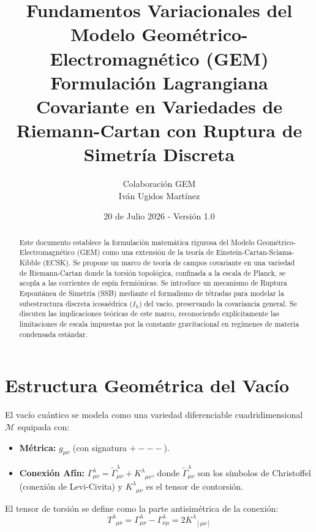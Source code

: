 \documentclass[12pt, a4paper]{article}
\title{\textbf{Fundamentos Variacionales del Modelo Geométrico-Electromagnético (GEM)} \\[0.3cm]
\large Formulación Lagrangiana Covariante en Variedades de Riemann-Cartan con Ruptura de Simetría Discreta}
\author{Colaboración GEM \\ Iván Ugidos Martínez}
\date{20 de Julio 2026 - Versión 1.0}
\begin{document}
\maketitle

\begin{abstract}
\noindent Este documento establece la formulación matemática rigurosa del Modelo Geométrico-Electromagnético (GEM) como una extensión de la teoría de Einstein-Cartan-Sciama-Kibble (ECSK). Se propone un marco de teoría de campos covariante en una variedad de Riemann-Cartan donde la torsión topológica, confinada a la escala de Planck, se acopla a las corrientes de espín fermiónicas. Se introduce un mecanismo de Ruptura Espontánea de Simetría (SSB) mediante el formalismo de tétradas para modelar la subestructura discreta icosaédrica ($I_h$) del vacío, preservando la covariancia general. Se discuten las implicaciones teóricas de este marco, reconociendo explícitamente las limitaciones de escala impuestas por la constante gravitacional en regímenes de materia condensada estándar.
\end{abstract}

\tableofcontents
\newpage

\section{Estructura Geométrica del Vacío}

El vacío cuántico se modela como una variedad diferenciable cuadridimensional $\mathcal{M}$ equipada con:
\begin{itemize}
    \item \textbf{Métrica:} $g_{\mu\nu}$ (con signatura $+---$).
    \item \textbf{Conexión Afín:} $\Gamma^\lambda_{\mu\nu} = \tilde{\Gamma}^\lambda_{\mu\nu} + K^\lambda_{\phantom{\lambda}\mu\nu}$, donde $\tilde{\Gamma}^\lambda_{\mu\nu}$ son los símbolos de Christoffel (conexión de Levi-Civita) y $K^\lambda_{\phantom{\lambda}\mu\nu}$ es el tensor de contorsión.
\end{itemize}

El tensor de torsión se define como la parte antisimétrica de la conexión:
\begin{equation}
    T^\lambda_{\phantom{\lambda}\mu\nu} = \Gamma^\lambda_{\mu\nu} - \Gamma^\lambda_{\nu\mu} = 2K^\lambda_{\phantom{\lambda}[\mu\nu]}
\end{equation}
\end{document}
